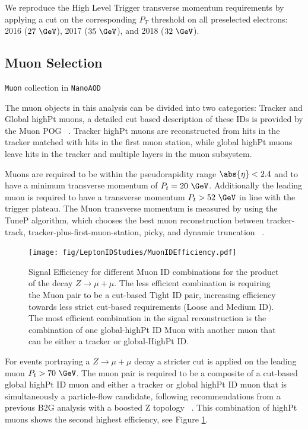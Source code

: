 We reproduce the High Level Trigger transverse momentum requirements by
applying a cut on the corresponding $P_T$ threshold on all
preselected electrons:
2016 ($27~\GeV$), 2017 ($35~\GeV$), and 2018 ($32~\GeV$).

\subsection{Muon Selection}

\verb|Muon| collection in \verb|NanoAOD|

The muon objects in this analysis can be divided into two categories:
Tracker and Global highPt muons, a detailed cut based description
of these IDs is provided by the Muon POG ~\cite{MuonPOG}.
Tracker highPt muons are reconstructed from hits in the tracker matched
with hits in the first muon station, while global highPt muons leave hits in the
tracker and multiple layers in the muon subsystem.

Muons are required to be within the pseudorapidity range $\abs{\eta}<2.4$ and
to have a minimum transverse momentum of $P_t=20~\GeV$. Additionally the leading muon
is required to have a transverse momentum $P_t>52~\GeV$ in line with
the trigger plateau. The Muon transverse momentum is measured by using
the TuneP algorithm, which chooses the best muon reconstruction
between tracker-track, tracker-plus-first-muon-station, picky, and
dynamic truncation ~\cite{MuonHighPtAN}. 

\begin{figure}[tph]
  \centering
  \texttt{[image: fig/LeptonIDStudies/MuonIDEfficiency.pdf]}
  \caption{Signal Efficiency for different Muon ID combinations for the product of
    the decay $Z\rightarrow\mu+\mu$. The less efficient combination is requiring
    the Muon pair to be a cut-based Tight ID pair, increasing efficiency towards less
    strict cut-based requirements (Loose and Medium ID). The most efficient combination in
    the signal reconstruction is the combination of one global-highPt ID Muon
    with another muon that can be either a tracker or global-HighPt ID.}
  \label{fig:MuonIDEfficiency}
\end{figure}

For events portraying a $Z\rightarrow\mu+\mu$ decay a stricter cut is applied on the
leading muon $P_{t}>70~\GeV$. The muon pair is required to be a composite of a
cut-based global highPt ID muon and either a tracker or global highPt ID muon
that is simultaneously a particle-flow candidate, following recommendations from
a previous B2G analysis with a boosted Z topology ~\cite{b2g-19-006}.
This combination of highPt muons shows the second highest efficiency, see
Figure \ref{fig:MuonIDEfficiency}.

